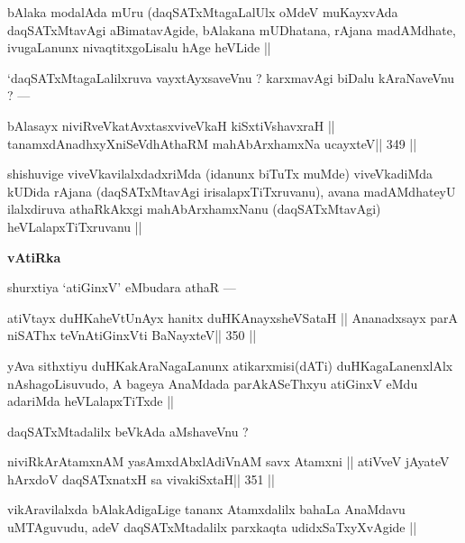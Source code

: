 \begin{artha}
bAlaka modalAda mUru (daqSATxMtagaLalUlx oMdeV muKayxvAda daqSATxMtavAgi aBimatavAgide, bAlakana mUDhatana, rAjana madAMdhate, ivugaLanunx nivaqtitxgoLisalu hAge heVLide ||
\end{artha}

\begin{artha}
`daqSATxMtagaLalilxruva vayxtAyxsaveVnu ? karxmavAgi biDalu kAraNaveVnu ? ---
\end{artha}

\begin{shl}
bAlasayx niviRveVkatAvxtasxviveVkaH kiSxtiVshavxraH ||
tanamxdAnadhxyXniSeVdhAthaRM mahAbArxhamxNa ucayxteV\hfill || 349 ||
\end{shl}

\begin{artha}
shishuvige viveVkavilalxdadxriMda (idanunx biTuTx muMde) viveVkadiMda kUDida rAjana (daqSATxMtavAgi irisalapxTiTxruvanu), avana madAMdhateyU ilalxdiruva athaRkAkxgi mahAbArxhamxNanu (daqSATxMtavAgi) heVLalapxTiTxruvanu ||
\end{artha}

\begin{center}
{\large\bf vAtiRka}
\end{center}

\begin{artha}
shurxtiya `atiGinxV' eMbudara athaR ---
\end{artha}

\begin{shl}
atiVtayx duHKaheVtUnAyx hanitx duHKAnayxsheVSataH ||
Ananadxsayx parA niSAThx teVnAtiGinxVti BaNayxteV\hfill || 350 ||
\end{shl}

\begin{artha}
yAva sithxtiyu duHKakAraNagaLanunx atikarxmisi(dATi) duHKagaLanenxlAlx nAshagoLisuvudo, A bageya AnaMdada parAkASeThxyu atiGinxV eMdu adariMda heVLalapxTiTxde ||
\end{artha}

\begin{artha}
daqSATxMtadalilx beVkAda aMshaveVnu ?
\end{artha}

\begin{shl}
niviRkArAtamxnAM yasAmxdAbxlAdiVnAM savx Atamxni ||
atiVveV jAyateV hArxdoV daqSATxnatxH sa vivakiSxtaH\hfill || 351 ||
\end{shl}

\begin{artha}
vikAravilalxda bAlakAdigaLige tananx Atamxdalilx bahaLa AnaMdavu uMTAguvudu, adeV daqSATxMtadalilx parxkaqta udidxSaTxyXvAgide ||
\end{artha}

